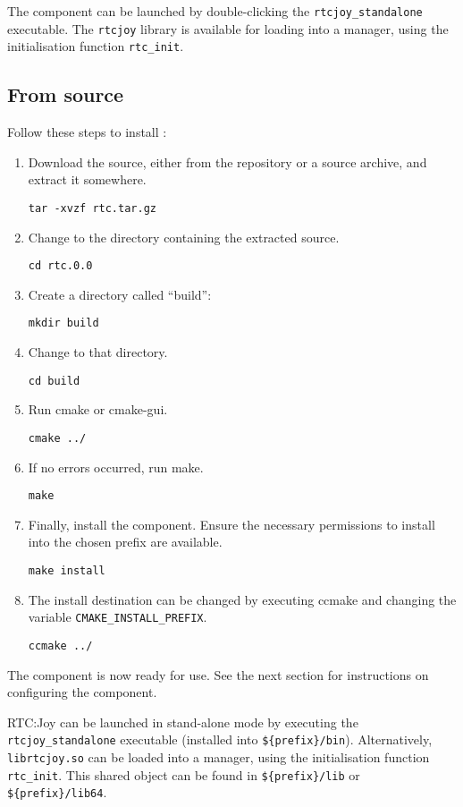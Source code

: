 \documentclass[a4paper,10pt]{article}
\begin{document}
The component can be launched by double-clicking the \verb|rtcjoy_standalone|
executable. The \verb|rtcjoy| library is available for loading into a manager,
using the initialisation function \verb|rtc_init|.

\subsection{From source}

Follow these steps to install :

\begin{enumerate}
  \item Download the source, either from the repository or a source archive,
  and extract it somewhere.

  \verb|tar -xvzf rtc.tar.gz|
  \item Change to the directory containing the extracted source.

  \verb|cd rtc.0.0|
  \item Create a directory called ``build'':

  \verb|mkdir build|
  \item Change to that directory.

  \verb|cd build|
  \item Run cmake or cmake-gui.

  \verb|cmake ../|
  \item If no errors occurred, run make.

  \verb|make|
  \item Finally, install the component. Ensure the necessary permissions to
  install into the chosen prefix are available.

  \verb|make install|
  \item The install destination can be changed by executing ccmake and changing
  the variable \verb|CMAKE_INSTALL_PREFIX|.

  \verb|ccmake ../|
\end{enumerate}

The component is now ready for use. See the next section for instructions on
configuring the component.

RTC:Joy can be launched in stand-alone mode by executing the
\verb|rtcjoy_standalone| executable (installed into \verb|${prefix}/bin|).
Alternatively, \verb|librtcjoy.so| can be loaded into a manager, using the
initialisation function \verb|rtc_init|. This shared object can be found in
\verb|${prefix}/lib| or \verb|${prefix}/lib64|.
\end{document}

